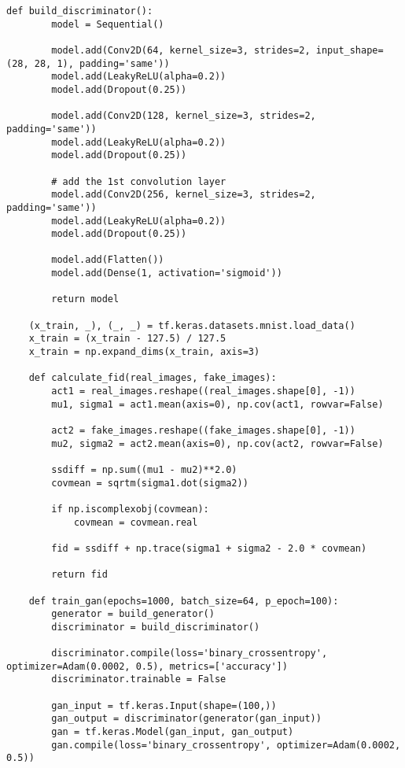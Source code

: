 \begin{lstlisting}[style=mypython, caption= {Explore GAN with 6 Convolutional Layers in Generator \\ and 4 Convolutional Layers in Discriminator}]
    def build_discriminator():
        model = Sequential()
        
        model.add(Conv2D(64, kernel_size=3, strides=2, input_shape=(28, 28, 1), padding='same'))
        model.add(LeakyReLU(alpha=0.2))
        model.add(Dropout(0.25))
    
        model.add(Conv2D(128, kernel_size=3, strides=2, padding='same'))
        model.add(LeakyReLU(alpha=0.2))
        model.add(Dropout(0.25))
    
        # add the 1st convolution layer
        model.add(Conv2D(256, kernel_size=3, strides=2, padding='same'))
        model.add(LeakyReLU(alpha=0.2))
        model.add(Dropout(0.25))
    
        model.add(Flatten())
        model.add(Dense(1, activation='sigmoid'))
    
        return model
    
    (x_train, _), (_, _) = tf.keras.datasets.mnist.load_data()
    x_train = (x_train - 127.5) / 127.5
    x_train = np.expand_dims(x_train, axis=3)
    
    def calculate_fid(real_images, fake_images):
        act1 = real_images.reshape((real_images.shape[0], -1))
        mu1, sigma1 = act1.mean(axis=0), np.cov(act1, rowvar=False)
        
        act2 = fake_images.reshape((fake_images.shape[0], -1))
        mu2, sigma2 = act2.mean(axis=0), np.cov(act2, rowvar=False)
        
        ssdiff = np.sum((mu1 - mu2)**2.0)
        covmean = sqrtm(sigma1.dot(sigma2))
        
        if np.iscomplexobj(covmean):
            covmean = covmean.real
        
        fid = ssdiff + np.trace(sigma1 + sigma2 - 2.0 * covmean)
        
        return fid
    
    def train_gan(epochs=1000, batch_size=64, p_epoch=100):
        generator = build_generator()
        discriminator = build_discriminator()
    
        discriminator.compile(loss='binary_crossentropy', optimizer=Adam(0.0002, 0.5), metrics=['accuracy'])
        discriminator.trainable = False
    
        gan_input = tf.keras.Input(shape=(100,))
        gan_output = discriminator(generator(gan_input))
        gan = tf.keras.Model(gan_input, gan_output)
        gan.compile(loss='binary_crossentropy', optimizer=Adam(0.0002, 0.5))
    

\end{lstlisting}

